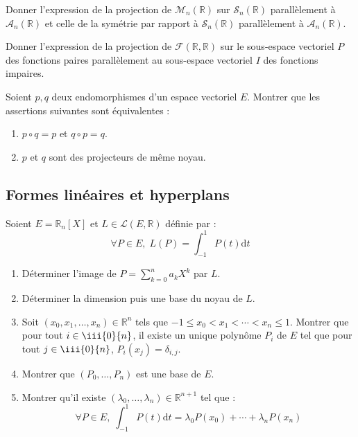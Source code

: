 \documentclass[a4paper,twoside,french,11pt]{VcCours}
\newcommand{\dt}{\text{d}t}
\begin{document}
\begin{Exercice}{} Donner l'expression de la projection de $\mathcal{M}_n(\mathbb{R})$ sur $\mathcal{S}_n(\mathbb{R})$ parallèlement à $\mathcal{A}_n(\mathbb{R})$ et celle de la symétrie par rapport à $\mathcal{S}_n(\mathbb{R})$ parallèlement à $\mathcal{A}_n(\mathbb{R})$.
\end{Exercice}



\begin{Exercice}{} Donner l'expression de la projection de $\mathcal{F}(\mathbb{R}, \mathbb{R})$ sur le sous-espace vectoriel $P$ des fonctions paires parallèlement au sous-espace vectoriel $I$ des fonctions impaires.
\end{Exercice}


\begin{Exercice}[$\bigstar$] Soient $p,q$ deux endomorphismes d'un espace vectoriel $E$. Montrer que les assertions suivantes sont équivalentes :
    \begin{enumerate}
\item $p \circ q = p$ et $q \circ p = q$.
\item $p$ et $q$ sont des projecteurs de même noyau.
    \end{enumerate}
\end{Exercice}




\medskip

\subsection{\large Formes linéaires et hyperplans}

\medskip

\begin{Exercice}[$\bigstar$] Soient $E= \mathbb{R}_n[X]$ et $L \in \mathcal{L}(E, \mathbb{R})$ définie par :
$$ \forall P \in E, \;  L(P) = \int_{-1}^1 P(t) \dt$$
\begin{enumerate}
\item Déterminer l'image de $P= \sum_{k=0}^n a_k X^k$ par $L$.
\item Déterminer la dimension puis une base du noyau de $L$.
\item Soit $(x_0, x_1, \ldots, x_n) \in \mathbb{R}^n$ tels que $-1 \leq x_0 < x_1 < \cdots < x_n \leq 1$. Montrer que pour tout $i \in \iii{0}{n}$, il existe un unique polynôme $P_i$ de $E$ tel que pour tout $j \in \iii{0}{n}$, $P_i(x_j)= \delta_{i,j}$.
\item Montrer que $(P_0, \ldots, P_n)$ est une base de $E$.
\item Montrer qu'il existe $(\lambda_0, \ldots, \lambda_n) \in \mathbb{R}^{n+1}$ tel que :
$$ \forall P \in E, \; \int_{-1}^1 P(t) \dt = \lambda_0 P(x_0) + \cdots + \lambda_n P(x_n)$$
\end{enumerate}
\end{Exercice}
\end{document}
